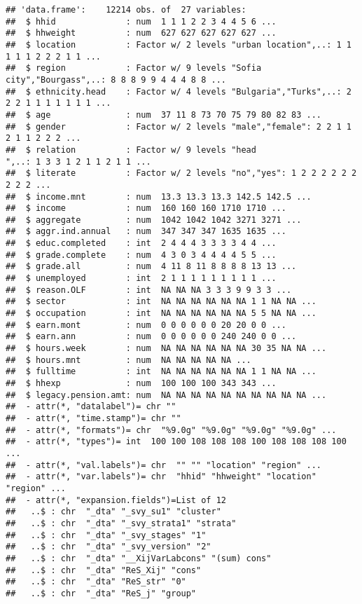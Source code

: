 \documentclass[]{article}
\begin{document}
\begin{verbatim}
## 'data.frame':    12214 obs. of  27 variables:
##  $ hhid              : num  1 1 1 2 2 3 4 4 5 6 ...
##  $ hhweight          : num  627 627 627 627 627 ...
##  $ location          : Factor w/ 2 levels "urban location",..: 1 1 1 1 1 2 2 2 1 1 ...
##  $ region            : Factor w/ 9 levels "Sofia city","Bourgass",..: 8 8 8 9 9 4 4 4 8 8 ...
##  $ ethnicity.head    : Factor w/ 4 levels "Bulgaria","Turks",..: 2 2 2 1 1 1 1 1 1 1 ...
##  $ age               : num  37 11 8 73 70 75 79 80 82 83 ...
##  $ gender            : Factor w/ 2 levels "male","female": 2 2 1 1 2 1 1 2 2 2 ...
##  $ relation          : Factor w/ 9 levels "head                      ",..: 1 3 3 1 2 1 1 2 1 1 ...
##  $ literate          : Factor w/ 2 levels "no","yes": 1 2 2 2 2 2 2 2 2 2 ...
##  $ income.mnt        : num  13.3 13.3 13.3 142.5 142.5 ...
##  $ income            : num  160 160 160 1710 1710 ...
##  $ aggregate         : num  1042 1042 1042 3271 3271 ...
##  $ aggr.ind.annual   : num  347 347 347 1635 1635 ...
##  $ educ.completed    : int  2 4 4 4 3 3 3 3 4 4 ...
##  $ grade.complete    : num  4 3 0 3 4 4 4 4 5 5 ...
##  $ grade.all         : num  4 11 8 11 8 8 8 8 13 13 ...
##  $ unemployed        : int  2 1 1 1 1 1 1 1 1 1 ...
##  $ reason.OLF        : int  NA NA NA 3 3 3 9 9 3 3 ...
##  $ sector            : int  NA NA NA NA NA NA 1 1 NA NA ...
##  $ occupation        : int  NA NA NA NA NA NA 5 5 NA NA ...
##  $ earn.mont         : num  0 0 0 0 0 0 20 20 0 0 ...
##  $ earn.ann          : num  0 0 0 0 0 0 240 240 0 0 ...
##  $ hours.week        : num  NA NA NA NA NA NA 30 35 NA NA ...
##  $ hours.mnt         : num  NA NA NA NA NA ...
##  $ fulltime          : int  NA NA NA NA NA NA 1 1 NA NA ...
##  $ hhexp             : num  100 100 100 343 343 ...
##  $ legacy.pension.amt: num  NA NA NA NA NA NA NA NA NA NA ...
##  - attr(*, "datalabel")= chr ""
##  - attr(*, "time.stamp")= chr ""
##  - attr(*, "formats")= chr  "%9.0g" "%9.0g" "%9.0g" "%9.0g" ...
##  - attr(*, "types")= int  100 100 108 108 108 100 108 108 108 100 ...
##  - attr(*, "val.labels")= chr  "" "" "location" "region" ...
##  - attr(*, "var.labels")= chr  "hhid" "hhweight" "location" "region" ...
##  - attr(*, "expansion.fields")=List of 12
##   ..$ : chr  "_dta" "_svy_su1" "cluster"
##   ..$ : chr  "_dta" "_svy_strata1" "strata"
##   ..$ : chr  "_dta" "_svy_stages" "1"
##   ..$ : chr  "_dta" "_svy_version" "2"
##   ..$ : chr  "_dta" "__XijVarLabcons" "(sum) cons"
##   ..$ : chr  "_dta" "ReS_Xij" "cons"
##   ..$ : chr  "_dta" "ReS_str" "0"
##   ..$ : chr  "_dta" "ReS_j" "group"

\end{verbatim}
\end{document}
